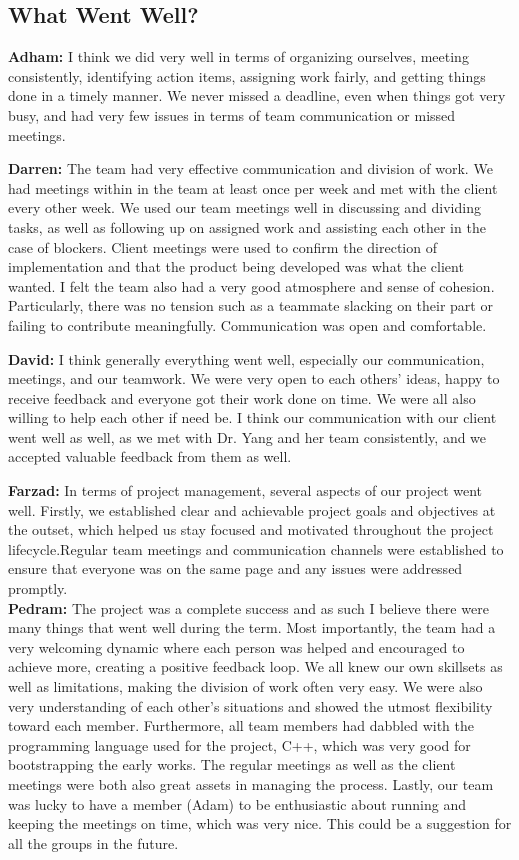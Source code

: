 \documentclass{article}
\begin{document}
\subsection{What Went Well?}

\textbf{Adham:} I think we did very well in terms of organizing ourselves, meeting consistently, identifying action items, assigning work fairly, and getting things done in 
a timely manner. We never missed a deadline, even when things got very busy, and had very few issues in terms of team communication or missed meetings.

\textbf{Darren:} The team had very effective communication and division of work. We had meetings  within in the team at least once per week and met with the client every other week. We used our team meetings well in discussing and dividing tasks, as well as following up on assigned work and assisting each other in the case of blockers. Client meetings were used to confirm the direction of implementation and that the product being developed was what the client wanted. I felt the team also had a very good atmosphere and sense of cohesion. Particularly, there was no tension such as a teammate slacking on their part or failing to contribute meaningfully. Communication was open and comfortable.

\textbf{David:} I think generally everything went well, especially our communication, meetings, and our teamwork. We 
were very open to each others' ideas, happy to receive feedback and everyone got their work done on time. We were all 
also willing to help each other if need be. I think our communication with our client went well as well, as we met with 
Dr. Yang and her team consistently, and we accepted valuable feedback from them as well. 

\textbf{Farzad: }In terms of project management, several aspects of our project went well. Firstly, we established clear and achievable project goals and objectives at the outset, which helped us stay focused and motivated throughout the project lifecycle.Regular team meetings and communication channels were established to ensure that everyone was on the same page and any issues were addressed promptly.\\

\textbf{Pedram:} The project was a complete success and as such I believe there were many things that went well during the term. Most importantly, the team had a very welcoming dynamic where each person was helped and encouraged to achieve more, creating a positive feedback loop. We all knew our own skillsets as well as limitations, making the division of work often very easy. We were also very understanding of each other’s situations and showed the utmost flexibility toward each member. Furthermore, all team members had dabbled with the programming language used for the project, C++, which was very good for bootstrapping the early works. The regular meetings as well as the client meetings were both also great assets in managing the process. Lastly, our team was lucky to have a member (Adam) to be enthusiastic about running and keeping the meetings on time, which was very nice. This could be a suggestion for all the groups in the future. 
\end{document}
